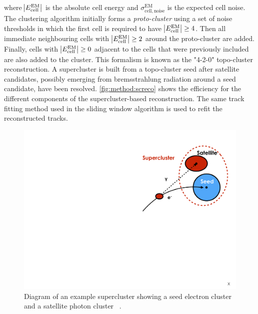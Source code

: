 where $\abs{E^{\mathrm{EM}}_{\mathrm{cell}}}$ is the absolute cell energy and $\sigma^{\mathrm{EM}}_{\mathrm{cell,noise}}$ is the expected cell noise. The clustering algorithm initially forms a \emph{proto-cluster} using a set of noise thresholds in which the first cell is required to have $\abs{E^{\mathrm{EM}}_{\mathrm{cell}}} \geq 4$. Then all immediate neighbouring cells with $\abs{E^{\mathrm{EM}}_{\mathrm{cell}}} \geq 2$ around the proto-cluster are added. Finally, cells with $\abs{E^{\mathrm{EM}}_{\mathrm{cell}}} \geq 0$ adjacent to the cells that were previously included are also added to the cluster. This formalism is known as the "4-2-0" topo-cluster reconstruction. A supercluster is built from a topo-cluster seed after satellite candidates, possibly emerging from bremsstrahlung radiation around a seed candidate, have been resolved. \cref{fig:method:screco} shows the efficiency for the different components of the supercluster-based reconstruction. The same track fitting method used in the sliding window algorithm is used to refit the reconstructed tracks.
\begin{figure}[h]
    \centering
    \includegraphics[width=\mediumfigwidth]{images/topo-cluster.pdf}
    \caption[Diagram of an example supercluster showing a seed electron cluster and a satellite photon cluster.]{Diagram of an example supercluster showing a seed electron cluster and a satellite photon cluster ~\cite{ATL-PHYS-PUB-2017-022}.}
    \label{fig:method:superclusterscheme}
\end{figure}
